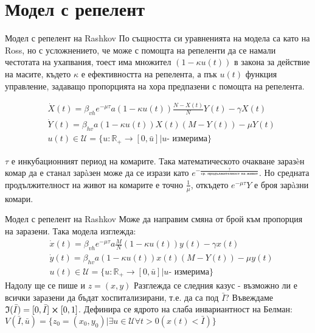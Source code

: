 \section{Модел с репелент}
\begin{frame}[t]{Модел с репелент на Rashkov}
  По същността си уравненията на модела са като на Ross, но с усложнението, че може с помощта на репеленти да се намали честотата на ухапвания, тоест има множител $(1 - \kappa u(t))$ в закона за действие на масите, където $\kappa$ е ефективността на репелента, а пък $u(t)$ функция управление, задаващо пропорцията на хора предпазени с помощта на репелента.

  \begin{equation}
    \label{eq:RepelentProblem}
    \begin{split}
      &\dot{X}(t) = \beta_{vh} e^{-\mu \tau} a (1-\kappa u(t)) \frac{N-X(t)}{N} Y(t) - \gamma X(t) \\
      &\dot{Y}(t) = \beta_{hv} a (1-\kappa u(t)) X(t) (M-Y(t)) - \mu Y(t) \\
      &u(t) \in \mathscr{U} = \{u:\mathbb{R}_+ \rightarrow [0, \bar{u}] \vert u \text{- измерима}\}
    \end{split}
  \end{equation}

  $\tau$ е инкубационният период на комарите. Така математическото очакване заразèн комар да е станал зарàзен може да се изрази като $e^{-\frac{\tau}{\text{ср. продължителност на живот}}}$. Но средната продължителност на живот на комарите е точно $\frac{1}{\mu}$, откъдето $e^{-\mu\tau}Y$ е броя зарàзни комари.
\end{frame}

\begin{frame}[t]{Модел с репелент на Rashkov}
  Може да направим смяна от брой към пропорция на заразени. Така модела изглежда:
  \begin{equation}
    \begin{split}
      &\dot{x}(t) = \beta_{vh} e^{-\mu \tau} a \frac{M}{N} (1-\kappa u(t)) y(t) - \gamma x(t) \\
      &\dot{y}(t) = \beta_{hv} a (1-\kappa u(t)) x(t) (M-Y(t)) - \mu y(t) \\
      &u(t) \in \mathscr{U} = \{u:\mathbb{R}_+ \rightarrow [0, \bar{u}] \vert u \text{- измерима}\}
    \end{split}
  \end{equation}
  Надолу ще се пише и $z=(x,y)$
  Разглежда се следния казус - възможно ли е всички заразени да бъдат хоспитализирани, т.е. да са под $\bar{I}$?
  Въвеждаме $\mathfrak{I}(\bar{I}) = [0, \bar{I}] \cross [0, 1]$.
  Дефинира се ядрото на слаба инвариантност на Белман:
  $V(\bar{I}, \bar{u}) = \{z_0=(x_0, y_0) \vert \exists{u \in \mathscr{U}}\forall t>0 \left(x(t) < \bar{I}\right)\}$
\end{frame}

